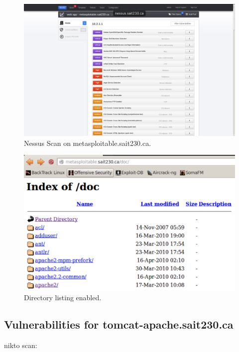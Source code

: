 \documentclass{article}
\begin{document}
\begin{figure}[h!]
	\includegraphics[width=\linewidth]{images/nessus-metasploitable.png}
	\caption{Nessus Scan on metasploitable.sait230.ca.}
	\label{fig:nessus-metasploitable}
\end{figure}

\begin{figure}[h!]
	\includegraphics[width=\linewidth]{images/screenshot.png}
	\caption{Directory listing enabled.}
	\label{fig:directory-listing}
\end{figure}

\subsection{Vulnerabilities for tomcat-apache.sait230.ca}
nikto scan:
\end{document}
